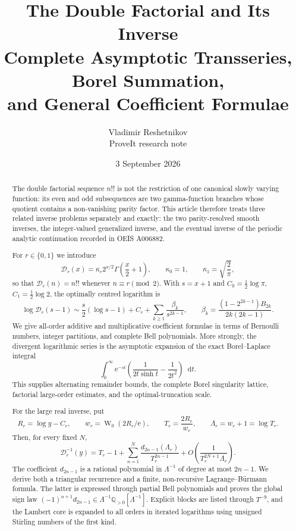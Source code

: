 \documentclass[11pt,a4paper,oneside]{article}
\theoremstyle{plain}
\theoremstyle{definition}
\theoremstyle{remark}
\newcommand{\e}{\mathrm e}
\newcommand{\dd}{\mathop{}\!\mathrm d}
\newcommand{\Q}{\mathbb Q}
\newcommand{\W}{\operatorname W}
\newcommand{\D}{\mathcal D}
\begin{document}
\title{\textbf{The Double Factorial and Its Inverse}\\[0.35em]
  \Large Complete Asymptotic Transseries, Borel Summation,\\
  and General Coefficient Formulae}
\author{Vladimir Reshetnikov\\
  \small ProveIt research note}
\date{3 September 2026}
\maketitle

\begin{abstract}
The double factorial sequence $n!!$ is not the restriction of one canonical
slowly varying function: its even and odd subsequences are two gamma-function
branches whose quotient contains a non-vanishing parity factor.  This article
therefore treats three related inverse problems separately and exactly: the two
parity-resolved smooth inverses, the integer-valued generalized inverse, and the
eventual inverse of the periodic analytic continuation recorded in OEIS
A006882.

For $r\in\{0,1\}$ we introduce
\[
 \D_r(x)=\kappa_r2^{x/2}\Gamma\!\left(\frac{x}{2}+1\right),
 \qquad \kappa_0=1,\qquad \kappa_1=\sqrt{\frac2\pi},
\]
so that $\D_r(n)=n!!$ whenever $n\equiv r\pmod2$.  With $s=x+1$ and
$C_0=\tfrac12\log\pi$, $C_1=\tfrac12\log2$, the optimally centred logarithm is
\[
 \log\D_r(s-1)\sim \frac{s}{2}(\log s-1)+C_r
 +\sum_{k\ge1}\frac{\beta_k}{s^{2k-1}},
 \qquad
 \beta_k=\frac{(1-2^{2k-1})B_{2k}}{2k(2k-1)}.
\]
We give all-order additive and multiplicative coefficient formulae in terms of
Bernoulli numbers, integer partitions, and complete Bell polynomials.  More
strongly, the divergent logarithmic series is the asymptotic expansion of the
exact Borel--Laplace integral
\[
 \int_0^\infty \e^{-st}
 \left(\frac{1}{2t\sinh t}-\frac{1}{2t^2}\right)\dd t.
\]
This supplies alternating remainder bounds, the complete Borel singularity
lattice, factorial large-order estimates, and the optimal-truncation scale.

For the large real inverse, put
\[
 R_r=\log y-C_r,\qquad w_r=\W_0(2R_r/\e),\qquad
 T_r=\frac{2R_r}{w_r},\qquad \Lambda_r=w_r+1=\log T_r.
\]
Then, for every fixed $N$,
\[
 \D_r^{-1}(y)=T_r-1+
 \sum_{n=1}^{N}\frac{d_{2n-1}(\Lambda_r)}{T_r^{2n-1}}
 +O\!\left(\frac{1}{T_r^{2N+1}\Lambda_r}\right).
\]
The coefficient $d_{2n-1}$ is a rational polynomial in $\Lambda^{-1}$ of
degree at most $2n-1$.  We derive both a triangular recurrence and a finite,
non-recursive Lagrange--B\"urmann formula.  The latter is expressed through
partial Bell polynomials and proves the global sign law
$(-1)^{n+1}d_{2n-1}\in\Lambda^{-1}\Q_{>0}[\Lambda^{-1}]$.  Explicit blocks are
listed through $T^{-9}$, and the Lambert core is expanded to all orders in
iterated logarithms using unsigned Stirling numbers of the first kind.


\end{abstract}
\end{document}
